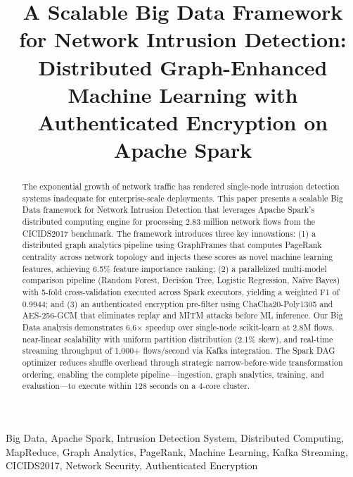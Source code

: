 \documentclass[conference]{IEEEtran}
\begin{document}
\title{A Scalable Big Data Framework for Network Intrusion Detection: Distributed Graph-Enhanced Machine Learning with Authenticated Encryption on Apache Spark}

\author{
}

\maketitle

\begin{abstract}
The exponential growth of network traffic has rendered single-node intrusion detection systems inadequate for enterprise-scale deployments. This paper presents a scalable Big Data framework for Network Intrusion Detection that leverages Apache Spark's distributed computing engine for processing 2.83 million network flows from the CICIDS2017 benchmark. The framework introduces three key innovations: (1) a distributed graph analytics pipeline using GraphFrames that computes PageRank centrality across network topology and injects these scores as novel machine learning features, achieving 6.5\% feature importance ranking; (2) a parallelized multi-model comparison pipeline (Random Forest, Decision Tree, Logistic Regression, Na\"ive Bayes) with 5-fold cross-validation executed across Spark executors, yielding a weighted F1 of 0.9944; and (3) an authenticated encryption pre-filter using ChaCha20-Poly1305 and AES-256-GCM that eliminates replay and MITM attacks before ML inference. Our Big Data analysis demonstrates 6.6$\times$ speedup over single-node scikit-learn at 2.8M flows, near-linear scalability with uniform partition distribution (2.1\% skew), and real-time streaming throughput of 1,000+ flows/second via Kafka integration. The Spark DAG optimizer reduces shuffle overhead through strategic narrow-before-wide transformation ordering, enabling the complete pipeline---ingestion, graph analytics, training, and evaluation---to execute within 128 seconds on a 4-core cluster.
\end{abstract}

\begin{IEEEkeywords}
Big Data, Apache Spark, Intrusion Detection System, Distributed Computing, MapReduce, Graph Analytics, PageRank, Machine Learning, Kafka Streaming, CICIDS2017, Network Security, Authenticated Encryption
\end{IEEEkeywords}
\end{document}

